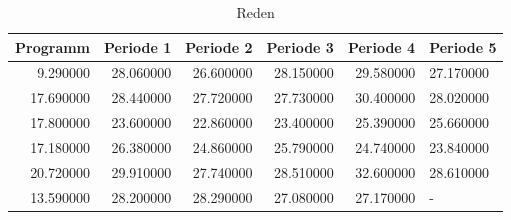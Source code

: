 \begin{table}
\caption{Reden}
\label{tab:meine_tabelle}
\begin{tabular}{rrrrrl}
\toprule
Programm & Periode 1 & Periode 2 & Periode 3 & Periode 4 & Periode 5 \\
\midrule
9.290000 & 28.060000 & 26.600000 & 28.150000 & 29.580000 & 27.170000 \\
17.690000 & 28.440000 & 27.720000 & 27.730000 & 30.400000 & 28.020000 \\
17.800000 & 23.600000 & 22.860000 & 23.400000 & 25.390000 & 25.660000 \\
17.180000 & 26.380000 & 24.860000 & 25.790000 & 24.740000 & 23.840000 \\
20.720000 & 29.910000 & 27.740000 & 28.510000 & 32.600000 & 28.610000 \\
13.590000 & 28.200000 & 28.290000 & 27.080000 & 27.170000 & - \\
\bottomrule
\end{tabular}
\end{table}
